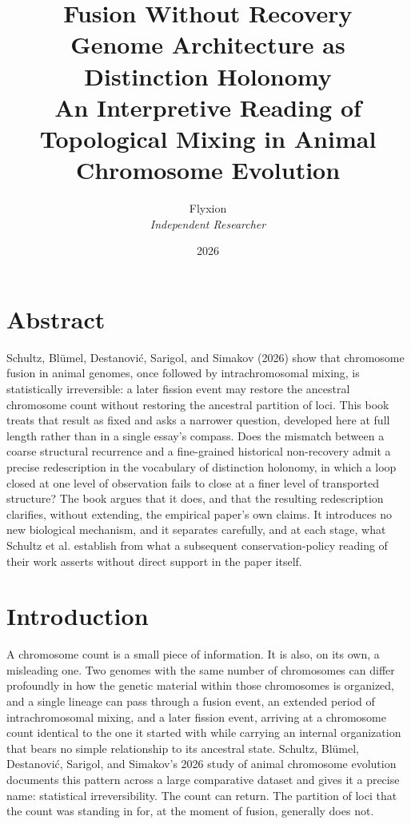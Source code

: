 \documentclass[11pt]{book}
\title{\textbf{Fusion Without Recovery}\\[0.3em]
\large Genome Architecture as Distinction Holonomy\\[0.3em]
\normalsize An Interpretive Reading of Topological Mixing in Animal Chromosome Evolution}
\author{Flyxion \\ \textit{Independent Researcher}}
\date{2026}
\begin{document}
\frontmatter
\maketitle

\chapter*{Abstract}
\noindent Schultz, Bl\"umel, Destanovi\'c, Sarigol, and Simakov (2026) show that chromosome fusion in animal genomes, once followed by intrachromosomal mixing, is statistically irreversible: a later fission event may restore the ancestral chromosome count without restoring the ancestral partition of loci. This book treats that result as fixed and asks a narrower question, developed here at full length rather than in a single essay's compass. Does the mismatch between a coarse structural recurrence and a fine-grained historical non-recovery admit a precise redescription in the vocabulary of distinction holonomy, in which a loop closed at one level of observation fails to close at a finer level of transported structure? The book argues that it does, and that the resulting redescription clarifies, without extending, the empirical paper's own claims. It introduces no new biological mechanism, and it separates carefully, and at each stage, what Schultz et al. establish from what a subsequent conservation-policy reading of their work asserts without direct support in the paper itself.

\tableofcontents
\listoffigures

\mainmatter

\chapter{Introduction}

A chromosome count is a small piece of information. It is also, on its own, a misleading one. Two genomes with the same number of chromosomes can differ profoundly in how the genetic material within those chromosomes is organized, and a single lineage can pass through a fusion event, an extended period of intrachromosomal mixing, and a later fission event, arriving at a chromosome count identical to the one it started with while carrying an internal organization that bears no simple relationship to its ancestral state. Schultz, Bl\"umel, Destanovi\'c, Sarigol, and Simakov's 2026 study of animal chromosome evolution documents this pattern across a large comparative dataset and gives it a precise name: statistical irreversibility. The count can return. The partition of loci that the count was standing in for, at the moment of fusion, generally does not.
\end{document}
